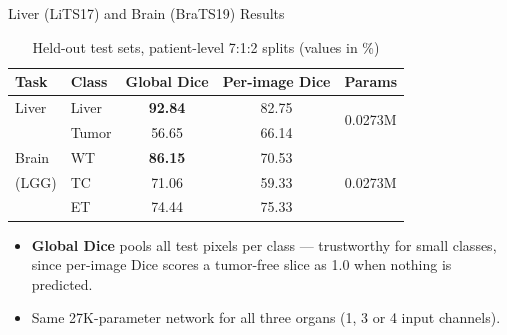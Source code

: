 \documentclass[11pt]{beamer}
\begin{document}
\begin{frame}{Liver (LiTS17) and Brain (BraTS19) Results}
    \begin{table}
        \centering
        \small
        \begin{tabular}{l|l|c|c|c}
            \hline
            \textbf{Task} & \textbf{Class} & \textbf{Global Dice} & \textbf{Per-image Dice} & \textbf{Params} \\ \hline
            Liver & Liver & \textbf{92.84} & 82.75 & \multirow{2}{*}{0.0273M} \\
                  & Tumor & 56.65 & 66.14 & \\ \hline
            Brain & WT    & \textbf{86.15} & 70.53 & \multirow{3}{*}{0.0273M} \\
            (LGG) & TC    & 71.06 & 59.33 & \\
                  & ET    & 74.44 & 75.33 & \\ \hline
        \end{tabular}
        \caption{Held-out test sets, patient-level 7:1:2 splits (values in \%)}
    \end{table}
    \begin{itemize}
        \item \textbf{Global Dice} pools all test pixels per class --- trustworthy for
              small classes, since per-image Dice scores a tumor-free slice as 1.0
              when nothing is predicted.
        \item Same 27K-parameter network for all three organs (1, 3 or 4 input channels).
    \end{itemize}
\end{frame}
\end{document}
